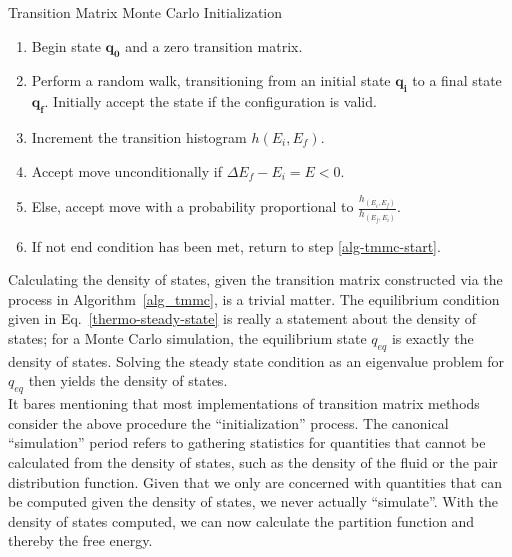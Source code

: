\documentclass[12pt]{article}
\begin{document}
\begin{algorithm}[tb]
    \caption{Transition Matrix Monte Carlo Initialization}
    \label{alg_tmmc}
    \hrulefill
    \begin{enumerate}
        \item Begin state $\mathbf{q_0}$ and a zero transition matrix.
        \item Perform a random walk, transitioning from an initial state $\mathbf{q_i}$ to a final state $\mathbf{q_{f}}$. Initially accept the state if the configuration is valid. \label{alg-tmmc-start}
        \item Increment the transition histogram $h(E_i, E_f)$.
        \item Accept move unconditionally if $\Delta E_f - E_i = E < 0$.
        \item Else, accept move with a probability proportional to $\frac{h_(E_i, E_f )}{h_(E_f, E_i)}$.
        \item If not end condition has been met, return to step \ref{alg-tmmc-start}.   
    \end{enumerate}
    \hrulefill
\end{algorithm}

Calculating the density of states, given the transition matrix constructed via the process in Algorithm~\ref{alg_tmmc}, is a trivial matter. The equilibrium condition given in Eq.~\ref{thermo-steady-state} is really a statement about the density of states; for a Monte Carlo simulation, the equilibrium state $q_{eq}$ is exactly the density of states. Solving the steady state condition as an eigenvalue problem for $q_{eq}$ then yields the density of states\cite{perlinthesis}. \\

It bares mentioning that most implementations of transition matrix methods consider the above procedure the ``initialization'' process. The canonical ``simulation'' period refers to gathering statistics for quantities that cannot be calculated from the density of states, such as the density of the fluid or the pair distribution function. Given that we only are concerned with quantities that can be computed given the density of states, we never actually ``simulate''. With the density of states computed, we can now calculate the partition function and thereby the free energy.
\end{document}
